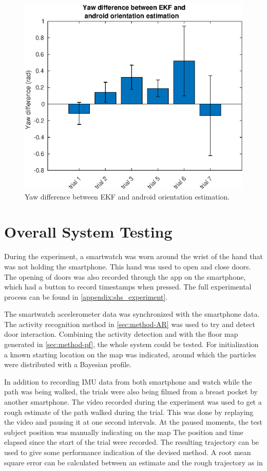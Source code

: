 \begin{figure}[H]
	\centering
	\includegraphics[width=0.65\linewidth]{images/20201118_1616_yaw_difference_between_android_and_EKF_1}
	\setlength{\belowcaptionskip}{-20pt}
	\caption{Yaw difference between EKF and android orientation estimation.}
	\label{fig:yaw_difference_between_android_and_ekf_1}
\end{figure}

\section{Overall System Testing}

During the experiment, a smartwatch was worn around the wrist of the hand that was not holding the smartphone. This hand was used to open and close doors. The opening of doors was also recorded through the app on the smartphone, which had a button to record timestamps when pressed. The full experimental process can be found in \cref{appendix:shs_experiment}. \par

The smartwatch accelerometer data was synchronized with the smartphone data. The activity recognition method in \cref{sec:method-AR} was used to try and detect door interaction. Combining the activity detection and  with the floor map generated in \cref{sec:method-pf}, the whole system could be tested. For initialization a known starting location on the map was indicated, around which the particles were distributed with a Bayesian profile.  \par 

In addition to recording IMU data from both smartphone and watch while the path was being walked, the trials were also being filmed from a breast pocket by another smartphone. The video recorded during the experiment was used to get a rough estimate of the path walked during the trial. This was done by replaying the video and pausing it at one second intervals. At the paused moments, the test subject position was manually indicating on the map The position and time elapsed since the start of the trial were recorded. The resulting trajectory can be used to give some performance indication of the devised method. A root mean square error can be calculated between an estimate and the rough trajectory as in

